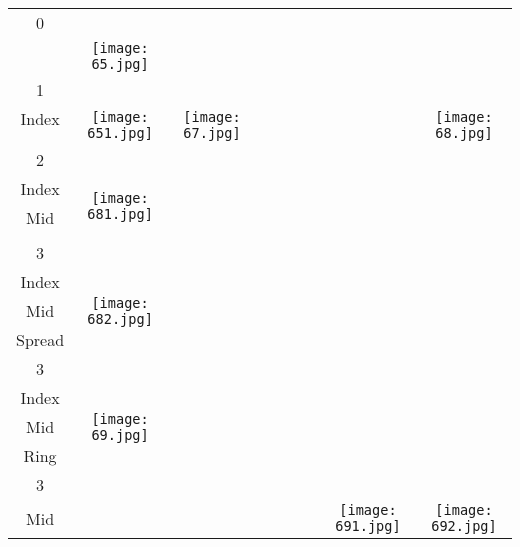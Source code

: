 \documentclass{tufte-book}
\begin{document}
\begin{fullwidth}
\begin{table}[h!]
\begin{center}
\begin{tabular}{|c|c|c|c|c|c|c|c|c|}
\hline
\footnotesize 0 &\footnotesize \pageref{page:65}&&&&&&&   \\
& \texttt{[image: 65.jpg]}&&&&&&& \\ \hline
\footnotesize 1 & \footnotesize \pageref{page:index1nothumb} & \footnotesize\pageref{page:67}&&&&&&\footnotesize\pageref{page:68} \\
\footnotesize Index & \multirow{3}{*}{\texttt{[image: 651.jpg]}} & \multirow{3}{*}{\texttt{[image: 67.jpg]}}&&&&&&\multirow{3}{*}{\texttt{[image: 68.jpg]}} \\ 
& & & & & & & &\\
& & & & & & & &\\\hline
\footnotesize 2 & \footnotesize \pageref{page:681} & & & & & & &\\
\footnotesize Index & \multirow{3}{*}{\texttt{[image: 681.jpg]}}& & & & & & &\\
\footnotesize Mid& & & & & & & &\\
& & & & & & & &\\\hline
\footnotesize 3 & \footnotesize \pageref{page:682} & & & & & & &\\
\footnotesize Index& \multirow{3}{*}{\texttt{[image: 682.jpg]}} & & & & & & &\\
\footnotesize Mid& & & & & & & &\\
\footnotesize Spread& & & & & & & &\\\hline
\footnotesize 3 & \footnotesize \pageref{page:69} & & & & & & &\\
\footnotesize Index& \multirow{3}{*}{\texttt{[image: 69.jpg]}} & & & & & & &\\
\footnotesize Mid& & & & & & & &\\
\footnotesize Ring& & & & & & & &\\\hline
\footnotesize 3& & & & & & & \footnotesize \pageref{page:691}&\footnotesize \pageref{page:692}\\
\footnotesize Mid& & & & & & &  \multirow{3}{*}{\texttt{[image: 691.jpg]}}& \multirow{3}{*}{\texttt{[image: 692.jpg]}}\\


\end{tabular}
\end{center}
\end{table}
\end{fullwidth}
\end{document}
